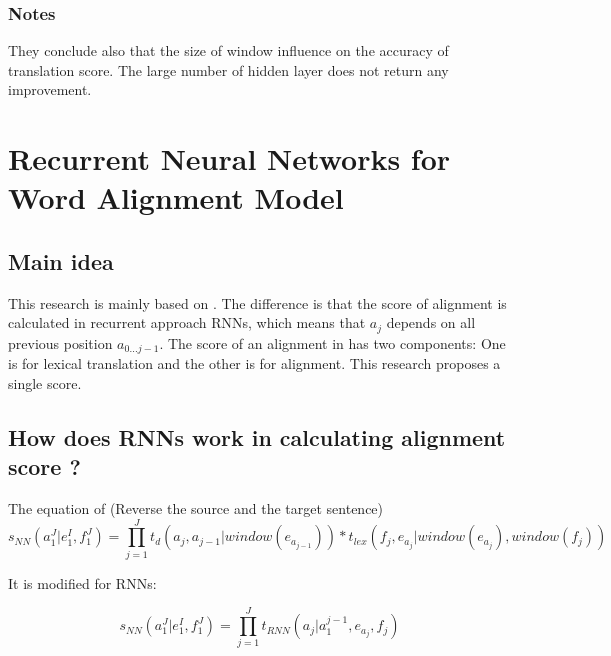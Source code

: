 \documentclass{article}
\begin{document}
\subsubsection{Notes}
They conclude also that the size of window influence on the accuracy of translation score.
The large number of hidden layer does not return any improvement.

\section{Recurrent Neural Networks for Word Alignment Model \citep{Tamura14recurrent}}

\subsection{Main idea}
This research is mainly based on \citep{Yang13word}. The difference is that the score of alignment is calculated in recurrent approach RNNs, which means that $a_j$ depends on all previous position $a_{0...j-1}$.
The score of an alignment in \citep{Yang13word} has two components: One is for lexical translation and the other is for alignment. This research proposes a single score.

\subsection{How does RNNs work in calculating alignment score ?}

The equation of \citep{Yang13word} (Reverse the source and the target sentence)
\begin{equation}
s_{NN}(a_1^ J|e_1^ I, f_1^ J) = \prod_{j = 1}^{J} t_{d}(a_{j},a_{j-1}|window(e_{a_{j-1}})) *t_{lex}(f_{j},e_{a_{j}}|window(e_{a_{j}}), window(f_{j}))
\end{equation}

It is modified for RNNs:

\begin{equation}
s_{NN}(a_1^ J|e_1^ I, f_1^ J) = \prod_{j = 1}^{J} t_{RNN}(a_{j}|a_1^{j-1},e_{a_{j}},f_j  )
\end{equation}
\end{document}
